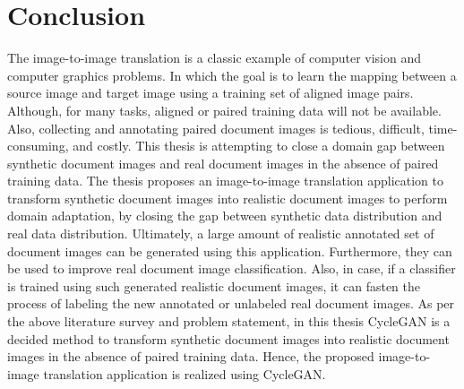 \section{Conclusion}\label{rwconclusion}

The image-to-image translation is a classic example of computer vision and computer graphics problems. In which the goal is to learn the mapping between a source image and target image using a training set of aligned image pairs. Although, for many tasks, aligned or paired training data will not be available. Also, collecting and annotating paired document images is tedious, difficult, time-consuming, and costly. This thesis is attempting to close a domain gap between synthetic document images and real document images in the absence of paired training data. The thesis proposes an image-to-image translation application to transform synthetic document images into realistic document images to perform domain adaptation, by closing the gap between synthetic data distribution and real data distribution. Ultimately, a large amount of realistic annotated set of document images can be generated using this application. Furthermore, they can be used to improve real document image classification. Also, in case, if a classifier is trained using such generated realistic document images, it can fasten the process of labeling the new annotated or unlabeled real document images. As per the above literature survey\cite{zhu2020unpaired}\cite{sharma2019learning} and problem statement, in this thesis \ac{CycleGAN} is a decided method to transform synthetic document images into realistic document images in the absence of paired training data. Hence, the proposed image-to-image translation application is realized using \ac{CycleGAN}.











